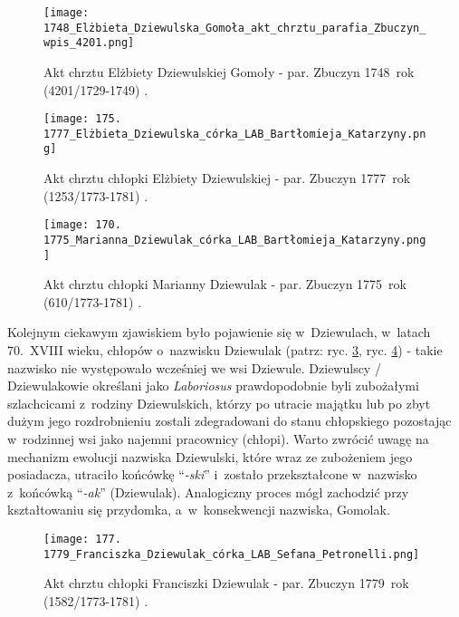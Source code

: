 \begin{figure}[!ht]
    \vspace*{0.5cm}
    \centering \texttt{[image: 
        1748\_Elżbieta\_Dziewulska\_Gomoła\_akt\_chrztu\_parafia\_Zbuczyn\_wpis\_4201.png]}
    \captionsetup{format=hang}
    \caption{Akt chrztu Elżbiety Dziewulskiej Gomoły - par. Zbuczyn 1748~rok 
    (4201/1729-1749) \cite{par_zbuczyn3}.}
    \label{fig:egomola_1748}
\end{figure}


\begin{figure}[!ht]
    \vspace*{0.5cm}
    \centering \texttt{[image: 
        175. 1777\_Elżbieta\_Dziewulska\_córka\_LAB\_Bartłomieja\_Katarzyny.png]}
    \captionsetup{format=hang}
    \caption{Akt chrztu chłopki Elżbiety Dziewulskiej - par. Zbuczyn 1777~rok 
    (1253/1773-1781) \cite{par_zbuczyn5}.}
    \label{fig:edziewulska_1777}
\end{figure}

\begin{figure}[!ht]
    \vspace*{0.5cm}
    \centering \texttt{[image: 
        170. 1775\_Marianna\_Dziewulak\_córka\_LAB\_Bartłomieja\_Katarzyny.png]}
    \captionsetup{format=hang}
    \caption{Akt chrztu chłopki Marianny Dziewulak - par. Zbuczyn 1775~rok 
    (610/1773-1781) \cite{par_zbuczyn5}.}
    \label{fig:mdziewulak_1775}
\end{figure}

Kolejnym ciekawym zjawiskiem było pojawienie się w~Dziewulach, w~latach 
70.~XVIII wieku, chłopów o~nazwisku Dziewulak (patrz: ryc. 
\ref{fig:mdziewulak_1775}, ryc. \ref{fig:fdziewulak_1779}) - takie nazwisko 
nie występowało wcześniej we wsi Dziewule. Dziewulscy / Dziewulakowie 
określani jako \emph{Laboriosus} prawdopodobnie byli zubożałymi szlachcicami 
z~rodziny Dziewulskich, którzy po utracie majątku lub po zbyt dużym jego 
rozdrobnieniu zostali zdegradowani do stanu chłopskiego pozostając 
w~rodzinnej wsi jako najemni pracownicy (chłopi). Warto zwrócić uwagę na 
mechanizm ewolucji nazwiska Dziewulski, które wraz ze zubożeniem jego 
posiadacza, utraciło końcówkę \enquote{\textit{-ski}} i~zostało 
przekształcone w~nazwisko z~końcówką \enquote{\textit{-ak}} (Dziewulak). 
Analogiczny proces mógł zachodzić przy kształtowaniu się przydomka, 
a~w~konsekwencji nazwiska, Gomolak.

\begin{figure}[!ht]
    \vspace*{0.5cm}
    \centering \texttt{[image: 
        177. 1779\_Franciszka\_Dziewulak\_córka\_LAB\_Sefana\_Petronelli.png]}
    \captionsetup{format=hang}
    \caption{Akt chrztu chłopki Franciszki Dziewulak - par. Zbuczyn 1779~rok 
    (1582/1773-1781) \cite{par_zbuczyn5}.}
    \label{fig:fdziewulak_1779}
\end{figure}

